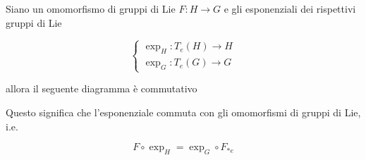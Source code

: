 \begin{definition}
	Siano un omomorfismo di gruppi di Lie $ F : H \to G $ e gli esponenziali dei rispettivi gruppi di Lie
	
	\begin{equation}
		\begin{cases}
			\exp_{H} : T_{e}(H) \to H\\
			\exp_{G} : T_{e}(G) \to G
		\end{cases}
	\end{equation}

	allora il seguente diagramma è commutativo
	
	
	Questo significa che l'esponenziale commuta con gli omomorfismi di gruppi di Lie, i.e.
	
	\begin{equation}
		F \circ \exp_{H} = \exp_{G} \circ F_{*e}
	\end{equation}
\end{definition}

